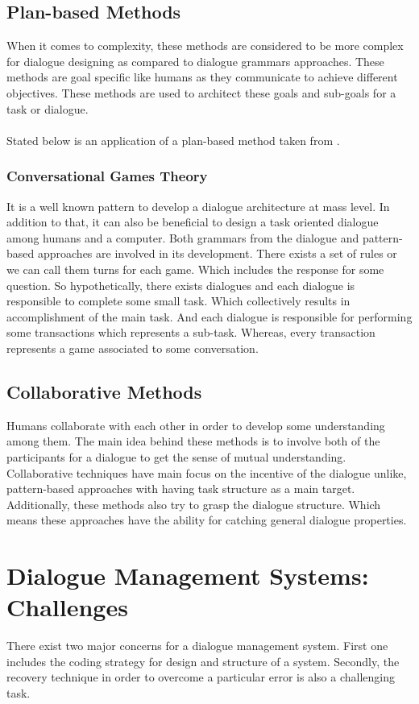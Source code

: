 \subsection{Plan-based Methods}
When it comes to complexity, these methods are considered to be more complex for dialogue designing as compared to dialogue grammars approaches. These methods are goal specific like humans as they communicate to achieve different objectives. These methods are used to architect these goals and sub-goals for a task or dialogue. \cite{dialoguemanagementsystems}
\\~\\
Stated below is an application of a plan-based method taken from \cite{dialoguemanagementsystems}.

\subsubsection*{Conversational Games Theory}
It is a well known pattern to develop a dialogue architecture at mass level. In addition to that, it can also be beneficial to design a task oriented dialogue among humans and a computer.  Both grammars from the dialogue and pattern-based approaches are involved in its development. There exists a set of rules or we can call them turns for each game. Which includes the response for some question. So hypothetically, there exists dialogues and each dialogue is responsible to complete some small task. Which collectively results in accomplishment of the main task. And each dialogue is responsible for performing some transactions which represents a sub-task. Whereas, every transaction represents a game associated to some conversation. 

\subsection{Collaborative Methods}
Humans collaborate with each other in order to develop some understanding among them. The main idea behind these methods is to involve both of the participants for a dialogue to get the sense of mutual understanding. Collaborative techniques have main focus on the incentive of the dialogue unlike, pattern-based approaches with having task structure as a main target. Additionally, these methods also try to grasp the dialogue structure. Which means these approaches have the ability for catching general dialogue properties. \cite{dialoguemanagementsystems}

\section{Dialogue Management Systems: Challenges}
There exist two major concerns for a dialogue management system. First one includes the coding strategy for design and structure of a system. Secondly, the recovery technique in order to overcome a particular error is also a challenging task.

